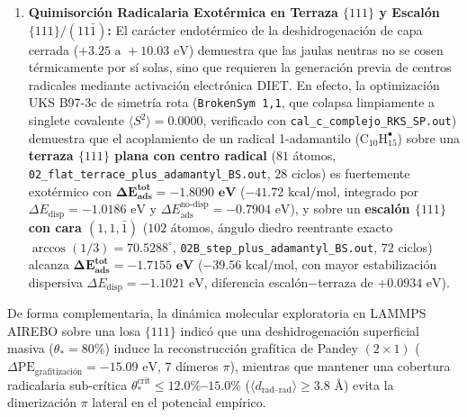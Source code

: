 \documentclass[10pt,twocolumn,a4paper]{article}
\begin{document}
\begin{enumerate}
    \item \textbf{Quimisorción Radicalaria Exotérmica en Terraza $\{111\}$ y Escalón $\{111\}/(11\bar{1})$:} El carácter endotérmico de la deshidrogenación de capa cerrada ($+3.25\text{ a }+10.03\text{ eV}$) demuestra que las jaulas neutras no se cosen térmicamente por sí solas, sino que requieren la generación previa de centros radicales mediante activación electrónica DIET. En efecto, la optimización UKS B97-3c de simetría rota (\texttt{BrokenSym 1,1}, que colapsa limpiamente a singlete covalente $\langle S^2\rangle = 0.0000$, verificado con \texttt{cal\_c\_complejo\_RKS\_SP.out}) demuestra que el acoplamiento de un radical 1-adamantilo ($\text{C}_{10}\text{H}_{15}^\bullet$) sobre una \textbf{terraza $\{111\}$ plana con centro radical} ($81$ átomos, \texttt{02\_flat\_terrace\_plus\_adamantyl\_BS.out}, $28$ ciclos) es fuertemente exotérmico con $\mathbf{\Delta E_{\text{ads}}^{\text{tot}} = -1.8090\text{ eV}}$ ($-41.72\text{ kcal/mol}$, integrado por $\Delta E_{\text{disp}} = -1.0186\text{ eV}$ y $\Delta E_{\text{ads}}^{\text{no-disp}} = -0.7904\text{ eV}$), y sobre un \textbf{escalón $\{111\}$ con cara $(1,1,\bar{1})$} ($102$ átomos, ángulo diedro reentrante exacto $\arccos(1/3) = 70.5288^\circ$, \texttt{02B\_step\_plus\_adamantyl\_BS.out}, $72$ ciclos) alcanza $\mathbf{\Delta E_{\text{ads}}^{\text{tot}} = -1.7155\text{ eV}}$ ($-39.56\text{ kcal/mol}$, con mayor estabilización dispersiva $\Delta E_{\text{disp}} = -1.1021\text{ eV}$, diferencia escalón$-$terraza de $+0.0934\text{ eV}$).
\end{enumerate}

De forma complementaria, la dinámica molecular exploratoria en LAMMPS AIREBO sobre una losa $\{111\}$ indicó que una deshidrogenación superficial masiva ($\theta_* = 80\%$) induce la reconstrucción grafítica de Pandey $(2\times 1)$ \cite{Pandey1981} ($\Delta\text{PE}_{\text{grafitización}} = -15.09\text{ eV}$, $7$ dímeros $\pi$), mientras que mantener una cobertura radicalaria sub-crítica \textbf{$\theta_*^{\text{crit}} \le 12.0\%$--$15.0\%$} ($\langle d_{\text{rad--rad}}\rangle \ge 3.8\text{ \AA}$) evita la dimerización $\pi$ lateral en el potencial empírico.
\end{document}
